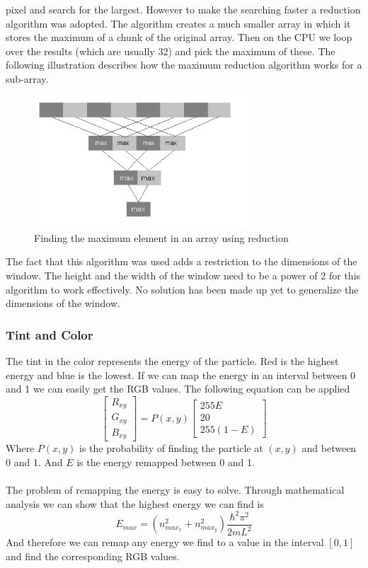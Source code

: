 \documentclass[a4paper, 10pt]{article}
\begin{document}
        pixel and search for the largest. However to make the searching faster a reduction algorithm
        was adopted. The algorithm creates a much smaller array in which it stores
        the maximum of a chunk of the original array. Then on the CPU we loop over the results (which are
        usually 32) and pick the maximum of these. The following illustration describes how the maximum
        reduction algorithm works for a sub-array.
        \begin{figure}[hb]
            \label{fig:reduction}
            \centering
                \includegraphics[width=8cm]{graphics/max_reduction.png}
            \caption{Finding the maximum element in an array using reduction}
        \end{figure}
        The fact that this algorithm was used adds a restriction to the dimensions of the window. The height
        and the width of the window need to be a power of 2 for this algorithm to work effectively.
        No solution has been made up yet to generalize the dimensions of the window.
        
        \subsubsection{Tint and Color}\label{sec:colormap}
        The tint in the color represents the energy of the particle. Red is the highest
        energy and blue is the lowest. If we can map the energy in an interval between
        0 and 1 we can easily get the RGB values. The following equation can be applied
        $$ \begin{bmatrix} R_{xy} \\ G_{xy} \\ B_{xy} \end{bmatrix} = P(x, y)
        \begin{bmatrix} 255E \\ 20 \\ 255(1-E) \end{bmatrix} $$
        Where $P(x, y)$ is the probability of finding the particle at $(x, y)$ and between
        0 and 1. And $E$ is the energy remapped between 0 and 1. \\\\
        The problem of remapping the energy is easy to solve. Through mathematical analysis
        we can show that the highest energy we can find is
        $$ E_{max} = (n^2_{max_x} + n^2_{max_y})\frac{\hbar^2\pi^2}{2mL^2} $$
        And therefore we can remap any energy we find to a value in the interval $[0, 1]$
        and find the corresponding RGB values.
\end{document}
